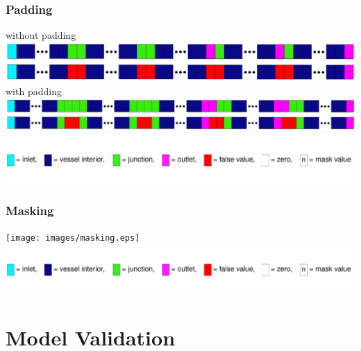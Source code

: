 \documentclass[compress]{beamer}
\begin{document}
\begin{frame}
	\frametitle{Padding}
	without padding
	\includegraphics[width=\textwidth]{images/padding1.eps}
	with padding
	\includegraphics[width=\textwidth]{images/padding2.eps}
	\includegraphics[width=\textwidth]{images/legend.eps}
\end{frame}
\begin{frame}
	\frametitle{Masking}
	\texttt{[image: images/masking.eps]}
	\includegraphics[width=\textwidth]{images/legend.eps}
\end{frame}

\section{Model Validation}
\end{document}

